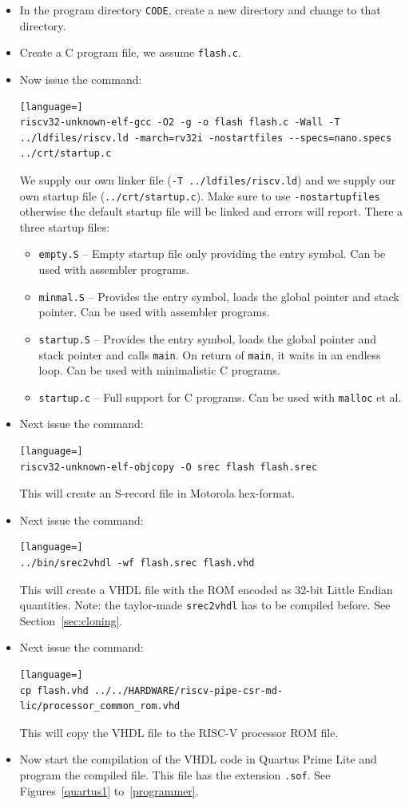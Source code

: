 \documentclass[12pt]{article}
\begin{document}
\begin{itemize}
\item In the program directory \lstinline|CODE|, create a new directory and change to that directory.
\item Create a C program file, we assume \lstinline|flash.c|.
\item Now issue the command:
\begin{lstlisting}[language=]
riscv32-unknown-elf-gcc -O2 -g -o flash flash.c -Wall -T ../ldfiles/riscv.ld -march=rv32i -nostartfiles --specs=nano.specs ../crt/startup.c
\end{lstlisting}
We supply our own linker file (\lstinline|-T ../ldfiles/riscv.ld|) and we supply our own startup file (\lstinline|../crt/startup.c|). Make sure to use \lstinline|-nostartupfiles| otherwise the default startup file will be linked and errors will report. There a three startup files:
\begin{itemize}
\item \texttt{empty.S} -- Empty startup file only providing the entry symbol. Can be used with assembler programs.
\item \texttt{minmal.S} -- Provides the entry symbol, loads the global pointer and stack pointer. Can be used with assembler programs.
\item \texttt{startup.S} -- Provides the entry symbol, loads the global pointer and stack pointer and calls \texttt{main}. On return of \texttt{main}, it waits in an endless loop. Can be used with minimalistic C programs.
\item \texttt{startup.c} -- Full support for C programs. Can be used with \texttt{malloc} et al.
\end{itemize}
\item Next issue the command:
\begin{lstlisting}[language=]
riscv32-unknown-elf-objcopy -O srec flash flash.srec
\end{lstlisting}
This will create an S-record file in Motorola hex-format.
\item Next issue the command:
\begin{lstlisting}[language=]
../bin/srec2vhdl -wf flash.srec flash.vhd
\end{lstlisting}
This will create a VHDL file with the ROM encoded as 32-bit Little Endian quantities. Note: the taylor-made \texttt{srec2vhdl} has to be compiled before. See Section~\ref{sec:cloning}.
\item Next issue the command:
\begin{lstlisting}[language=]
cp flash.vhd ../../HARDWARE/riscv-pipe-csr-md-lic/processor_common_rom.vhd
\end{lstlisting}
This will copy the VHDL file to the RISC-V processor ROM file.
\item Now start the compilation of the VHDL code in Quartus Prime Lite and program the compiled file. This file has the extension \lstinline|.sof|. See Figures~\ref{quartus1} to~\ref{programmer}.


\end{itemize}
\end{document}
